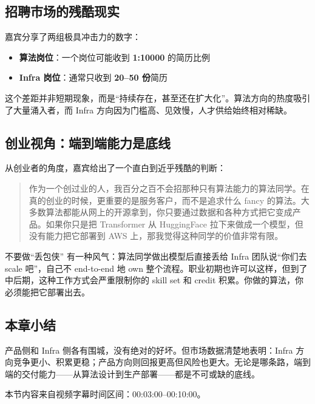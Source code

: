 \subsection{招聘市场的残酷现实}

嘉宾分享了两组极具冲击力的数字：

\begin{itemize}
    \item \textbf{算法岗位}：一个岗位可能收到 \textbf{1:10000} 的简历比例
    \item \textbf{Infra 岗位}：通常只收到 \textbf{20--50 份}简历
\end{itemize}

这个差距并非短期现象，而是``持续存在，甚至还在扩大化''。算法方向的热度吸引了大量涌入者，而 Infra 方向因为门槛高、见效慢，人才供给始终相对稀缺。

\subsection{创业视角：端到端能力是底线}

从创业者的角度，嘉宾给出了一个直白到近乎残酷的判断：

\begin{quote}
作为一个创过业的人，我百分之百不会招那种只有算法能力的算法同学。在真的创业的时候，更重要的是服务客户，而不是追求什么 fancy 的算法。大多数算法都能从网上的开源拿到，你只要通过数据和各种方式把它变成产品。如果你只是把 Transformer 从 HuggingFace 拉下来做成一个模型，但没有能力把它部署到 AWS 上，那我觉得这种同学的价值非常有限。
\end{quote}

\begin{warningbox}{不要做``丢包侠''}
有一种风气：算法同学做出模型后直接丢给 Infra 团队说``你们去 scale 吧''，自己不 end-to-end 地 own 整个流程。职业初期也许可以这样，但到了中后期，这种工作方式会严重限制你的 skill set 和 credit 积累。你做的算法，你必须能把它部署出去。
\end{warningbox}

\subsection{本章小结}

产品侧和 Infra 侧各有围城，没有绝对的好坏。但市场数据清楚地表明：Infra 方向竞争更小、积累更稳；产品方向则回报更高但风险也更大。无论是哪条路，端到端的交付能力——从算法设计到生产部署——都是不可或缺的底线。

\vspace{1em}
\noindent 本节内容来自视频字幕时间区间：00:03:00--00:10:00。



